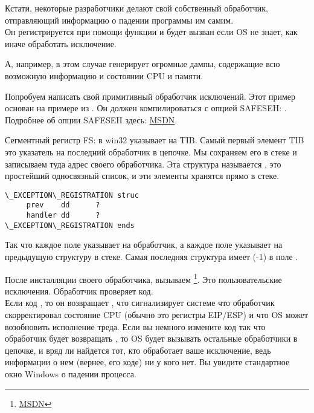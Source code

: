 Кстати, некоторые разработчики делают свой собственный обработчик,
отправляющий информацию о падении программы им самим.\\
Он регистрируется при помощи функции  
и будет вызван если \ac{OS} не знает, как иначе обработать исключение.

\myindex{\oracle}
А, например, \oracle в этом случае генерирует огромные дампы, 
содержащие всю возможную информацию и состоянии \ac{CPU} и памяти.

Попробуем написать свой примитивный обработчик исключений.
Этот пример основан на примере из \PietrekSEH.
Он должен компилироваться с опцией SAFESEH: .
Подробнее об опции SAFESEH здесь: \href{http://go.yurichev.com/17252}{MSDN}.
	


Сегментный регистр FS: в win32 указывает на \ac{TIB}.
Самый первый элемент \ac{TIB} это указатель на последний обработчик в цепочке.
Мы сохраняем его в стеке и записываем туда адрес своего обработчика.
Эта структура называется , 
это простейший односвязный список, и эти элементы хранятся прямо в стеке.

\begin{lstlisting}[caption=MSVC/VC/crt/src/exsup.inc]
\_EXCEPTION\_REGISTRATION struc
     prev    dd      ?
     handler dd      ?
\_EXCEPTION\_REGISTRATION ends
\end{lstlisting}

Так что каждое поле  указывает на обработчик,
а каждое поле  указывает на предыдущую структуру в стеке.
Самая последняя структура имеет  (-1) в поле .



После инсталляции своего обработчика, вызываем \footnote{\href{http://go.yurichev.com/17253}{MSDN}}.
Это пользовательские исключения. 
Обработчик проверяет код.\\
Если код , то он возвращает ,
что сигнализирует системе что обработчик скорректировал состояние CPU (обычно это регистры EIP/ESP) и что \ac{OS} может
возобновить исполнение треда.
Если вы немного измените код так что обработчик будет возвращать ,
то \ac{OS} будет вызывать остальные
обработчики в цепочке, и вряд ли найдется тот, кто обработает ваше исключение,
ведь информации о нем (вернее, его коде) ни у кого нет.
Вы увидите стандартное окно Windows о падении процесса.

